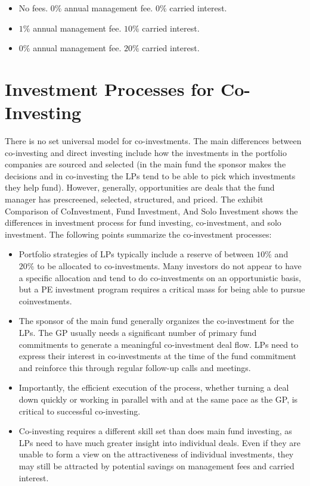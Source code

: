 \documentclass[11pt]{article}
\begin{document}
\begin{itemize}
  \item No fees. $0 \%$ annual management fee. $0 \%$ carried interest.
  \item $1 \%$ annual management fee. $10 \%$ carried interest.
  \item $0 \%$ annual management fee. $20 \%$ carried interest.
\end{itemize}

\section*{Investment Processes for Co-Investing}
There is no set universal model for co-investments. The main differences between co-investing and direct investing include how the investments in the portfolio companies are sourced and selected (in the main fund the sponsor makes the decisions and in co-investing the LPs tend to be able to pick which investments they help fund). However, generally, opportunities are deals that the fund manager has prescreened, selected, structured, and priced. The exhibit Comparison of CoInvestment, Fund Investment, And Solo Investment shows the differences in investment process for fund investing, co-investment, and solo investment. The following points summarize the co-investment processes:

\begin{itemize}
  \item Portfolio strategies of LPs typically include a reserve of between $10 \%$ and $20 \%$ to be allocated to co-investments. Many investors do not appear to have a specific allocation and tend to do co-investments on an opportunistic basis, but a PE investment program requires a critical mass for being able to pursue coinvestments.
  \item The sponsor of the main fund generally organizes the co-investment for the LPs. The GP usually needs a significant number of primary fund commitments to generate a meaningful co-investment deal flow. LPs need to express their interest in co-investments at the time of the fund commitment and reinforce this through regular follow-up calls and meetings.
  \item Importantly, the efficient execution of the process, whether turning a deal down quickly or working in parallel with and at the same pace as the GP, is critical to successful co-investing.
  \item Co-investing requires a different skill set than does main fund investing, as LPs need to have much greater insight into individual deals. Even if they are unable to form a view on the attractiveness of individual investments, they may still be attracted by potential savings on management fees and carried interest.
\end{itemize}
\end{document}
